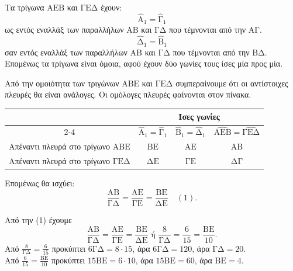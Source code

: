 \begin{alist}
    \item[α)] Τα τρίγωνα $\mathrm{AEB}$ και $\mathrm{\Gamma E\Delta}$ έχουν:
    \[ \widehat{\mathrm{A}}_1 = \widehat{\mathrm{\Gamma}}_1 \]
    ως εντός εναλλάξ των παραλλήλων $\mathrm{AB}$ και $\mathrm{\Gamma\Delta}$ που τέμνονται από την $\mathrm{A\Gamma}$.
    \[ \widehat{\mathrm{\Delta}}_1 = \widehat{\mathrm{B}}_1 \]
    σαν εντός εναλλάξ των παραλλήλων $\mathrm{AB}$ και $\mathrm{\Gamma\Delta}$ που τέμνονται από την $\mathrm{B\Delta}$.
    Επομένως τα τρίγωνα είναι όμοια, αφού έχουν δύο γωνίες τους ίσες μία προς μία.

    \item[β)] Από την ομοιότητα των τριγώνων $\mathrm{ABE}$ και $\mathrm{\Gamma E\Delta}$ συμπεραίνουμε ότι οι αντίστοιχες πλευρές θα είναι ανάλογες. Οι ομόλογες πλευρές φαίνονται στον πίνακα.
    \begin{center}
    \begin{tabular}{|c|c|c|c|}
    \hline
    \multicolumn{1}{|c|}{} & \multicolumn{3}{c|}{\textbf{Ίσες γωνίες}} \\
    \cline{2-4}
    \multicolumn{1}{|c|}{} & $\widehat{\mathrm{A}}_1 = \widehat{\mathrm{\Gamma}}_1$ & $\widehat{\mathrm{B}}_1 = \widehat{\mathrm{\Delta}}_1$ & $\widehat{\mathrm{AEB}} = \widehat{\mathrm{\Gamma E\Delta}}$ \\
    \hline
    Απέναντι πλευρά στο τρίγωνο $\mathrm{ABE}$ & $\mathrm{BE}$ & $\mathrm{AE}$ & $\mathrm{AB}$ \\
    \hline
    Απέναντι πλευρά στο τρίγωνο $\mathrm{\Gamma E\Delta}$ & $\mathrm{\Delta E}$ & $\mathrm{\Gamma E}$ & $\mathrm{\Delta\Gamma}$ \\
    \hline
    \end{tabular}
    \end{center}
    Επομένως θα ισχύει:
    \[ \frac{\mathrm{AB}}{\mathrm{\Gamma\Delta}} = \frac{\mathrm{AE}}{\mathrm{\Gamma E}} = \frac{\mathrm{BE}}{\mathrm{\Delta E}} \quad (1). \]

    \item[γ)] Από την (1) έχουμε
    \[ \frac{\mathrm{AB}}{\mathrm{\Gamma\Delta}} = \frac{\mathrm{AE}}{\mathrm{\Gamma E}} = \frac{\mathrm{BE}}{\mathrm{\Delta E}} \text{ ή } \frac{8}{\mathrm{\Gamma\Delta}} = \frac{6}{15} = \frac{\mathrm{BE}}{10}. \]
    Από $\frac{8}{\mathrm{\Gamma\Delta}} = \frac{6}{15}$ προκύπτει $6\mathrm{\Gamma\Delta} = 8 \cdot 15$, άρα $6\mathrm{\Gamma\Delta} = 120$, άρα $\mathrm{\Gamma\Delta} = 20$. \\
    Από $\frac{6}{15} = \frac{\mathrm{BE}}{10}$ προκύπτει $15\mathrm{BE} = 6 \cdot 10$, άρα $15\mathrm{BE} = 60$, άρα $\mathrm{BE} = 4$.
\end{alist}